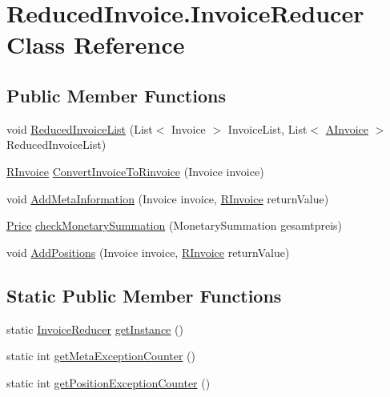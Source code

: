 \hypertarget{class_reduced_invoice_1_1_invoice_reducer}{}\section{Reduced\+Invoice.\+Invoice\+Reducer Class Reference}
\label{class_reduced_invoice_1_1_invoice_reducer}
\subsection*{Public Member Functions}
\begin{DoxyCompactItemize}
\item 
void \hyperlink{class_reduced_invoice_1_1_invoice_reducer_af064188d62db15e810468e4811af6cc5}{Reduced\+Invoice\+List} (List$<$ Invoice $>$ Invoice\+List, List$<$ \hyperlink{class_reduced_invoice_1_1_a_invoice}{A\+Invoice} $>$ Reduced\+Invoice\+List)
\item 
\hyperlink{class_reduced_invoice_1_1_r_invoice}{R\+Invoice} \hyperlink{class_reduced_invoice_1_1_invoice_reducer_a424cf7731d065d541c0a1bc613f5834a}{Convert\+Invoice\+To\+Rinvoice} (Invoice invoice)
\item 
void \hyperlink{class_reduced_invoice_1_1_invoice_reducer_aefec8c846739b1fe168b3c8828f25f4c}{Add\+Meta\+Information} (Invoice invoice, \hyperlink{class_reduced_invoice_1_1_r_invoice}{R\+Invoice} return\+Value)
\item 
\hyperlink{class_reduced_invoice_1_1_price}{Price} \hyperlink{class_reduced_invoice_1_1_invoice_reducer_a6caff41f142502c44cbeefc7b1e44c9d}{check\+Monetary\+Summation} (Monetary\+Summation gesamtpreis)
\item 
void \hyperlink{class_reduced_invoice_1_1_invoice_reducer_a599dbd87601635791534a8624cb8f953}{Add\+Positions} (Invoice invoice, \hyperlink{class_reduced_invoice_1_1_r_invoice}{R\+Invoice} return\+Value)
\end{DoxyCompactItemize}
\subsection*{Static Public Member Functions}
\begin{DoxyCompactItemize}
\item 
static \hyperlink{class_reduced_invoice_1_1_invoice_reducer}{Invoice\+Reducer} \hyperlink{class_reduced_invoice_1_1_invoice_reducer_ad4fafc7b331a78ef243c3e3ba88803da}{get\+Instance} ()
\item 
static int \hyperlink{class_reduced_invoice_1_1_invoice_reducer_a987de6f3876284a7b456240f85dc066f}{get\+Meta\+Exception\+Counter} ()
\item 
static int \hyperlink{class_reduced_invoice_1_1_invoice_reducer_ad5034d72d8eae0edc2026c9ca9e66465}{get\+Position\+Exception\+Counter} ()
\end{DoxyCompactItemize}



